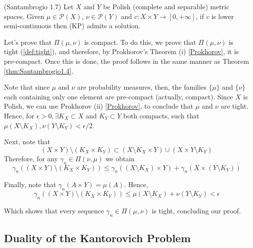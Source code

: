 \begin{theorem}(Santambrogio 1.7)
  Let $X$ and $Y$ be Polish (complete and separable) metric spaces.
  Given $\mu\in \mathcal{P}(X)$, $\nu \in \mathcal P(Y)$ and
  $c:X\times Y \to[0,+\infty]$, if $c$ is lower semi-continuous then
  (KP) admits a solution.
  \label{thm:existanceKPpolish}
\end{theorem}
\begin{prf}

  Let's prove that $\Pi(\mu,\nu)$ is compact. To do this,
  we prove that $\Pi(\mu,\nu)$
  is tight (\ref{def:tight}), and therefore, by Prokhorov's Theorem (i) \ref{Prokhorov},
  it is pre-compact. Once this is done,
  the proof follows in the same manner as Theorem
  \ref{thm:Santambrogio1.4}.

  Note that since $\mu$ and $\nu$ are probability measures, then,
  the families $\{\mu\}$ and $\{\nu\}$ each containing only one element
  are pre-compact (actually, compact). Since $X$ is Polish, we can use Prokhorov (ii)
  \ref{Prokhorov}, to conclude that $\mu$ and $\nu$ are tight.
  Hence,
  for $\epsilon > 0, \exists K_X \subset X$ and $K_Y \subset Y$
  both compacts, such that
  $\mu(X\setminus K_X), \nu(Y\setminus K_Y)<\epsilon /2$.

  Next, note that
  \begin{equation*}
    (X \times Y) \setminus (K_X \times K_Y) \subset
    (X \setminus K_X \times Y)\cup
    (X \times Y \setminus K_Y)
  \end{equation*}
  Therefore, for any $\gamma_n \in \Pi(\nu,\mu)$ we obtain
  \begin{equation*}
    \gamma_n((X \times Y) \setminus (K_X \times K_Y)) \leq
    \gamma_n((X \setminus K_X) \times Y) +
    \gamma_n(X \times (Y \setminus K_Y))
  \end{equation*}

  Finally, note that $\gamma_n(A \times Y) = \mu(A)$. Hence,
  \begin{equation*}
    \gamma_n((X \times Y) \setminus (K_X \times K_Y)) \leq
    \mu(X \setminus K_X) +
    \nu(Y \setminus K_Y) < \epsilon
  \end{equation*}

  Which shows that every sequence $\gamma_n \in \Pi(\mu,\nu)$ is
  tight, concluding our proof.


\end{prf}

\subsection{Duality of the Kantorovich Problem}

